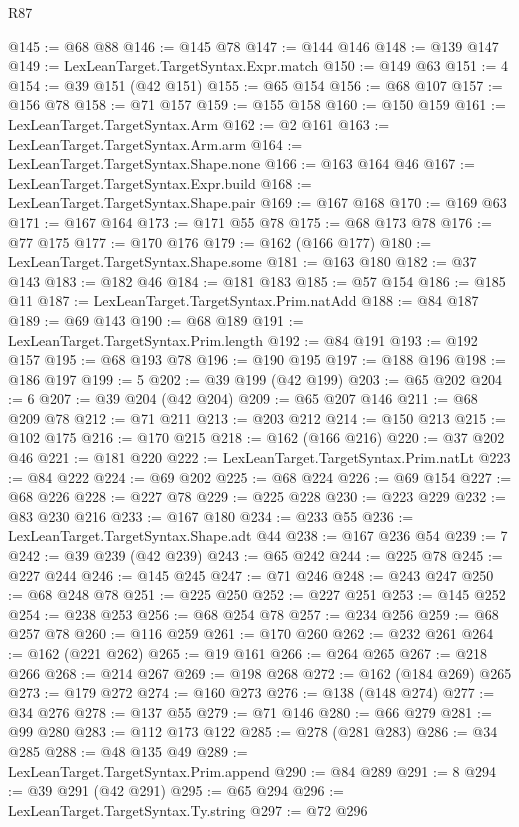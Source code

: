 \begin{lexlean}{R87}
\begin{coremodule}
@145 := @68 @88
@146 := @145 @78
@147 := @144 @146
@148 := @139 @147
@149 := LexLeanTarget.TargetSyntax.Expr.match
@150 := @149 @63
@151 := 4
@154 := @39 @151 (@42 @151)
@155 := @65 @154
@156 := @68 @107
@157 := @156 @78
@158 := @71 @157
@159 := @155 @158
@160 := @150 @159
@161 := LexLeanTarget.TargetSyntax.Arm
@162 := @2 @161
@163 := LexLeanTarget.TargetSyntax.Arm.arm
@164 := LexLeanTarget.TargetSyntax.Shape.none
@166 := @163 @164 @46
@167 := LexLeanTarget.TargetSyntax.Expr.build
@168 := LexLeanTarget.TargetSyntax.Shape.pair
@169 := @167 @168
@170 := @169 @63
@171 := @167 @164
@173 := @171 @55 @78
@175 := @68 @173 @78
@176 := @77 @175
@177 := @170 @176
@179 := @162 (@166 @177)
@180 := LexLeanTarget.TargetSyntax.Shape.some
@181 := @163 @180
@182 := @37 @143
@183 := @182 @46
@184 := @181 @183
@185 := @57 @154
@186 := @185 @11
@187 := LexLeanTarget.TargetSyntax.Prim.natAdd
@188 := @84 @187
@189 := @69 @143
@190 := @68 @189
@191 := LexLeanTarget.TargetSyntax.Prim.length
@192 := @84 @191
@193 := @192 @157
@195 := @68 @193 @78
@196 := @190 @195
@197 := @188 @196
@198 := @186 @197
@199 := 5
@202 := @39 @199 (@42 @199)
@203 := @65 @202
@204 := 6
@207 := @39 @204 (@42 @204)
@209 := @65 @207 @146
@211 := @68 @209 @78
@212 := @71 @211
@213 := @203 @212
@214 := @150 @213
@215 := @102 @175
@216 := @170 @215
@218 := @162 (@166 @216)
@220 := @37 @202 @46
@221 := @181 @220
@222 := LexLeanTarget.TargetSyntax.Prim.natLt
@223 := @84 @222
@224 := @69 @202
@225 := @68 @224
@226 := @69 @154
@227 := @68 @226
@228 := @227 @78
@229 := @225 @228
@230 := @223 @229
@232 := @83 @230 @216
@233 := @167 @180
@234 := @233 @55
@236 := LexLeanTarget.TargetSyntax.Shape.adt @44
@238 := @167 @236 @54
@239 := 7
@242 := @39 @239 (@42 @239)
@243 := @65 @242
@244 := @225 @78
@245 := @227 @244
@246 := @145 @245
@247 := @71 @246
@248 := @243 @247
@250 := @68 @248 @78
@251 := @225 @250
@252 := @227 @251
@253 := @145 @252
@254 := @238 @253
@256 := @68 @254 @78
@257 := @234 @256
@259 := @68 @257 @78
@260 := @116 @259
@261 := @170 @260
@262 := @232 @261
@264 := @162 (@221 @262)
@265 := @19 @161
@266 := @264 @265
@267 := @218 @266
@268 := @214 @267
@269 := @198 @268
@272 := @162 (@184 @269) @265
@273 := @179 @272
@274 := @160 @273
@276 := @138 (@148 @274)
@277 := @34 @276
@278 := @137 @55
@279 := @71 @146
@280 := @66 @279
@281 := @99 @280
@283 := @112 @173 @122
@285 := @278 (@281 @283)
@286 := @34 @285
@288 := @48 @135 @49
@289 := LexLeanTarget.TargetSyntax.Prim.append
@290 := @84 @289
@291 := 8
@294 := @39 @291 (@42 @291)
@295 := @65 @294
@296 := LexLeanTarget.TargetSyntax.Ty.string
@297 := @72 @296

\end{coremodule}
\end{lexlean}

